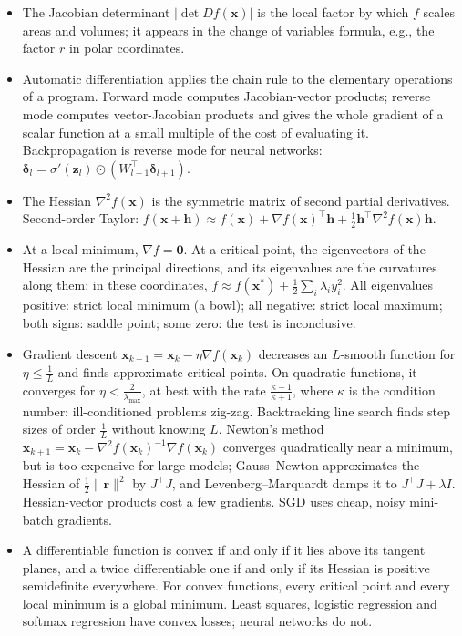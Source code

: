 \documentclass[11pt]{article}
\newcommand{\norm}[1]{\lVert #1 \rVert}
\theoremstyle{definition}
\theoremstyle{plain}
\theoremstyle{remark}
\begin{document}
\begin{itemize}[leftmargin=*]
    \item The Jacobian determinant $|\det Df(\mathbf{x})|$ is the local factor by which $f$ scales areas and volumes; it appears in the change of variables formula, e.g., the factor $r$ in polar coordinates.
    \item Automatic differentiation applies the chain rule to the elementary operations of a program. Forward mode computes Jacobian-vector products; reverse mode computes vector-Jacobian products and gives the whole gradient of a scalar function at a small multiple of the cost of evaluating it. Backpropagation is reverse mode for neural networks: $\boldsymbol{\delta}_l = \sigma'(\mathbf{z}_l) \odot (W_{l+1}^\top\boldsymbol{\delta}_{l+1})$.
    \item The Hessian $\nabla^2 f(\mathbf{x})$ is the symmetric matrix of second partial derivatives. Second-order Taylor: $f(\mathbf{x} + \mathbf{h}) \approx f(\mathbf{x}) + \nabla f(\mathbf{x})^\top\mathbf{h} + \frac{1}{2}\mathbf{h}^\top\nabla^2 f(\mathbf{x})\mathbf{h}$.
    \item At a local minimum, $\nabla f = \mathbf{0}$. At a critical point, the eigenvectors of the Hessian are the principal directions, and its eigenvalues are the curvatures along them: in these coordinates, $f \approx f(\mathbf{x}^*) + \frac{1}{2}\sum_i \lambda_i y_i^2$. All eigenvalues positive: strict local minimum (a bowl); all negative: strict local maximum; both signs: saddle point; some zero: the test is inconclusive.
    \item Gradient descent $\mathbf{x}_{k+1} = \mathbf{x}_k - \eta\nabla f(\mathbf{x}_k)$ decreases an $L$-smooth function for $\eta \leq \frac{1}{L}$ and finds approximate critical points. On quadratic functions, it converges for $\eta < \frac{2}{\lambda_{\max}}$, at best with the rate $\frac{\kappa - 1}{\kappa + 1}$, where $\kappa$ is the condition number: ill-conditioned problems zig-zag. Backtracking line search finds step sizes of order $\frac{1}{L}$ without knowing $L$. Newton's method $\mathbf{x}_{k+1} = \mathbf{x}_k - \nabla^2 f(\mathbf{x}_k)^{-1}\nabla f(\mathbf{x}_k)$ converges quadratically near a minimum, but is too expensive for large models; Gauss--Newton approximates the Hessian of $\frac{1}{2}\norm{\mathbf{r}}^2$ by $J^\top J$, and Levenberg--Marquardt damps it to $J^\top J + \lambda I$. Hessian-vector products cost a few gradients. SGD uses cheap, noisy mini-batch gradients.
    \item A differentiable function is convex if and only if it lies above its tangent planes, and a twice differentiable one if and only if its Hessian is positive semidefinite everywhere. For convex functions, every critical point and every local minimum is a global minimum. Least squares, logistic regression and softmax regression have convex losses; neural networks do not.

\end{itemize}
\end{document}
